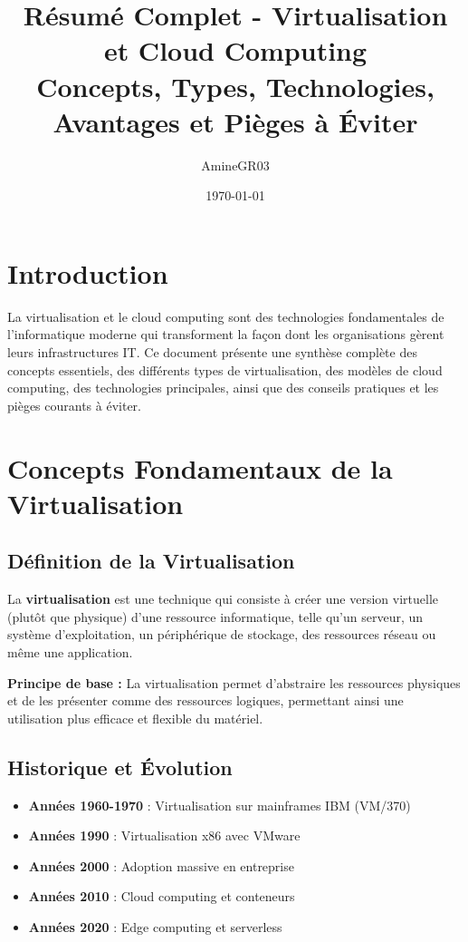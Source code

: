 \documentclass[11pt,a4paper]{article}
\title{Résumé Complet - Virtualisation et Cloud Computing\\
\large Concepts, Types, Technologies, Avantages et Pièges à Éviter}
\author{AmineGR03}
\date{\today}
\begin{document}
\maketitle

\tableofcontents
\newpage

\section{Introduction}

La virtualisation et le cloud computing sont des technologies fondamentales de l'informatique moderne qui transforment la façon dont les organisations gèrent leurs infrastructures IT. Ce document présente une synthèse complète des concepts essentiels, des différents types de virtualisation, des modèles de cloud computing, des technologies principales, ainsi que des conseils pratiques et les pièges courants à éviter.

\section{Concepts Fondamentaux de la Virtualisation}

\subsection{Définition de la Virtualisation}

\begin{definitionbox}
La \textbf{virtualisation} est une technique qui consiste à créer une version virtuelle (plutôt que physique) d'une ressource informatique, telle qu'un serveur, un système d'exploitation, un périphérique de stockage, des ressources réseau ou même une application.
\end{definitionbox}

\textbf{Principe de base :} La virtualisation permet d'abstraire les ressources physiques et de les présenter comme des ressources logiques, permettant ainsi une utilisation plus efficace et flexible du matériel.

\subsection{Historique et Évolution}

\begin{itemize}
    \item \textbf{Années 1960-1970} : Virtualisation sur mainframes IBM (VM/370)
    \item \textbf{Années 1990} : Virtualisation x86 avec VMware
    \item \textbf{Années 2000} : Adoption massive en entreprise
    \item \textbf{Années 2010} : Cloud computing et conteneurs
    \item \textbf{Années 2020} : Edge computing et serverless
\end{itemize}
\end{document}
